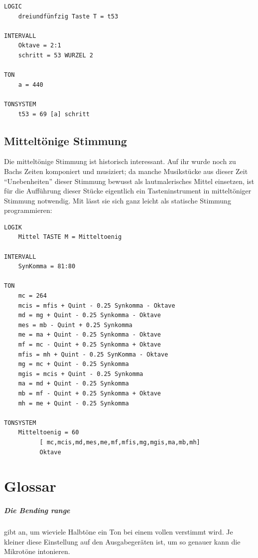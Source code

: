 
\begin{verbatim}
LOGIC
    dreiundfünfzig Taste T = t53

INTERVALL 
    Oktave = 2:1
    schritt = 53 WURZEL 2

TON
    a = 440 

TONSYSTEM
    t53 = 69 [a] schritt
\end{verbatim}

\section{Mitteltönige Stimmung}
\label{sec:EX_MITTELTOENIG}

Die mitteltönige Stimmung ist historisch interessant. Auf ihr 
wurde noch zu Bachs Zeiten komponiert und musiziert; da manche 
Musikstücke aus dieser Zeit "`Unebenheiten"' dieser Stimmung 
bewusst als lautmalerisches Mittel einsetzen, ist für die 
Aufführung dieser Stücke eigentlich ein Tasteninstrument 
in mitteltöniger Stimmung notwendig. Mit \mutabor{} lässt 
sie sich ganz leicht als statische Stimmung programmieren:



\begin{verbatim}
LOGIK 
    Mittel TASTE M = Mitteltoenig

INTERVALL 
    SynKomma = 81:80

TON
    mc = 264 
    mcis = mfis + Quint - 0.25 Synkomma - Oktave 
    md = mg + Quint - 0.25 Synkomma - Oktave 
    mes = mb - Quint + 0.25 Synkomma 
    me = ma + Quint - 0.25 Synkomma - Oktave 
    mf = mc - Quint + 0.25 Synkomma + Oktave 
    mfis = mh + Quint - 0.25 SynKomma - Oktave 
    mg = mc + Quint - 0.25 Synkomma 
    mgis = mcis + Quint - 0.25 Synkomma 
    ma = md + Quint - 0.25 Synkomma 
    mb = mf - Quint + 0.25 Synkomma + Oktave 
    mh = me + Quint - 0.25 Synkomma

TONSYSTEM
    Mitteltoenig = 60 
          [ mc,mcis,md,mes,me,mf,mfis,mg,mgis,ma,mb,mh] 
          Oktave
\end{verbatim}

\appendix

\chapter{Glossar}

\paragraph{Die Bending range}\label{sec:DV_BENDINGRANGE}gibt an,
  um wieviele Halbtöne ein Ton bei einem vollen
   verstimmt wird. Je kleiner diese
  Einstellung auf den Ausgabegeräten ist, um so genauer kann
  \mutabor{} die Mikrotöne intonieren.

